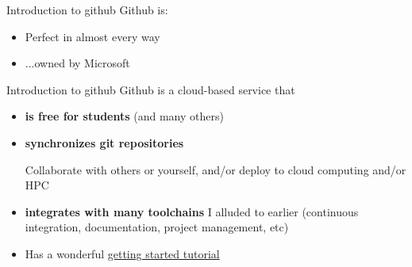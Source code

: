 \documentclass{beamer}
\begin{document}
\begin{frame}{Introduction to github}
  Github is:
  \begin{itemize}
  \item Perfect in almost every way 
  \item ...owned by Microsoft 
  \end{itemize}
\end{frame}

\begin{frame}{Introduction to github}
  Github is a cloud-based service that
  \begin{itemize}
  \item \textbf{is free for students} (and many others)
  \item \textbf{synchronizes git repositories}

    Collaborate with others or yourself, and/or deploy to cloud computing and/or HPC
    
  \item \textbf{integrates with many toolchains} I alluded to earlier (continuous integration, documentation, project management, etc)

  \item Has a wonderful {\color{blue} \href{https://docs.github.com/en/get-started/start-your-journey}{getting started tutorial}}
  \end{itemize}
\end{frame}
\end{document}
